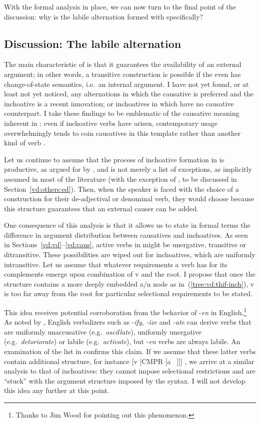 With the formal analysis in place, we can now turn to the final point of the discussion: why is the labile alternation formed with {\vd} specifically?


	\subsection{Discussion: The labile alternation}
The main characteristic of {\vd} is that it guarantees the availability of an external argument; in other words, a transitive construction is possible if the even has change-of-state semantics, i.e.~an internal argument. I have not yet found, or at least not yet noticed, any alternations in which the causative is preferred and the inchoative is a recent innovation; or inchoatives in {\thif} which have no causative counterpart. I take these findings to be emblematic of the causative meaning inherent in {\vd}: even if inchoative verbs have arisen, contemporary usage overwhelmingly tends to coin causatives in this template rather than another kind of verb \citep{laks14}.

Let us continue to assume that the process of inchoative formation in {\thif} is productive, as argued for by \cite{lev16}, and is not merely a list of exceptions, as implicitly assumed in most of the literature (with the exception of \citealt{doron03}, to be discussed in Section~\ref{vd:others:ed}). Then, when the speaker is faced with the choice of a construction for their de-adjectival or denominal verb, they would choose {\vd} because this structure guarantees that an external causer can be added.

One consequence of this analysis is that it allows us to state in formal terms the difference in argument distribution between causatives and inchoatives. As seen in Sections~\ref{vd:vd}--\ref{vd:caus}, active verbs in {\thif} might be unergative, transitive or ditransitive. These possibilities are wiped out for inchoatives, which are uniformly intransitive. Let us assume that whatever requirements a verb has for its complements emerge upon combination of v and the root. I propose that once the structure contains a more deeply embedded a/n node as in~(\ref{tree:vd:thif-inch}), v is too far away from the root for particular selectional requirements to be stated.

This idea receives potential corroboration from the behavior of -\emph{en} in English.\footnote{Thanks to Jim Wood for pointing out this phenomenon.} As noted by \cite{harley09n}, English verbalizers such as -\emph{ify}, \emph{-ize} and \emph{-ate} can derive verbs that are uniformly unaccusative (e.g.~\emph{oscillate}), uniformly unergative (e.g.~\emph{detoriorate}) or labile (e.g.~\emph{activate}), but -\emph{en} verbs are always labile. An examination of the list in \citet[245]{levin93} confirms this claim. If we assume that these latter verbs contain additional structure, for instance [v [CMPR [a ~\!]]] \citep{bobaljik12}, we arrive at a similar analysis to that of {\thif} inchoatives: they cannot impose selectional restrictions and are ``stuck'' with the argument structure imposed by the syntax. I will not develop this idea any further at this point.

